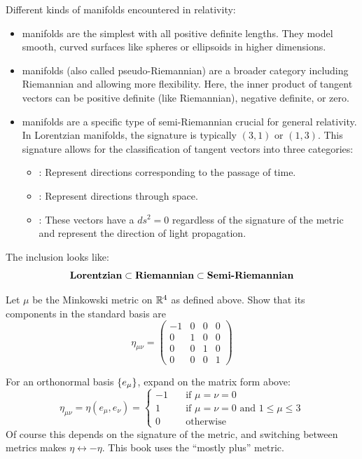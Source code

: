\documentclass[10pt]{article}
\begin{document}
\begin{definition}
	Different kinds of manifolds encountered in relativity:

	\begin{itemize}
		\item {} manifolds are the simplest with all positive definite lengths. They model smooth, curved surfaces like spheres or ellipsoids in higher dimensions.
		\item {} manifolds (also called pseudo-Riemannian) are a broader category including Riemannian and allowing more flexibility. Here, the inner product of tangent vectors can be positive definite (like Riemannian), negative definite, or zero.
		\item {} manifolds are a specific type of semi-Riemannian crucial for general relativity. In Lorentzian manifolds, the signature is typically $(3,1)$ or $(1,3)$. This signature allows for the classification of tangent vectors into three categories:
		\begin{itemize}
			\item {}: Represent directions corresponding to the passage of time.
			\item {}: Represent directions through space.
			\item {}: These vectors have a $ds^2 = 0$ regardless of the signature of the metric and represent the direction of light propagation.
		\end{itemize}
	\end{itemize}
	The inclusion looks like:
	$$
	\textbf{Lorentzian} \subset \textbf{Riemannian} \subset \textbf{Semi-Riemannian}
 	$$
\end{definition}


\begin{example}
	Let $\mu$ be the Minkowski metric on $\mathbb{R}^4$ as defined above. Show that its components in the standard basis are
	$$
		\eta_{\mu\nu} = \begin{pmatrix}
			-1&0&0&0\\0&1&0&0\\0&0&1&0\\0&0&0&1
		\end{pmatrix}
	$$
\end{example}
\sol For an orthonormal basis $\lbrace e_\mu\rbrace$, expand on the matrix form above:
$$
\eta_{\mu\nu} = \eta(e_\mu,e_\nu) = \begin{cases}
	-1& \quad\text{if $\mu=\nu=0$}\\
	1&  \quad\text{if $\mu=\nu=0$ and $1 \le \mu \le 3$}\\
	0&  \quad\text{otherwise}
\end{cases}
$$
Of course this depends on the signature of the metric, and switching between metrics makes $\eta \leftrightarrow -\eta$. This book uses the ``mostly plus'' metric.
\end{document}
